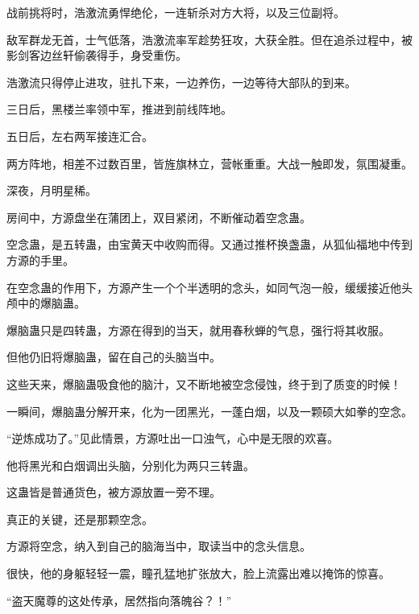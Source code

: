 \begin{this_body}
战前挑将时，浩激流勇悍绝伦，一连斩杀对方大将，以及三位副将。

敌军群龙无首，士气低落，浩激流率军趁势狂攻，大获全胜。但在追杀过程中，被影剑客边丝轩偷袭得手，身受重伤。

浩激流只得停止进攻，驻扎下来，一边养伤，一边等待大部队的到来。

三日后，黑楼兰率领中军，推进到前线阵地。

五日后，左右两军接连汇合。

两方阵地，相差不过数百里，皆旌旗林立，营帐重重。大战一触即发，氛围凝重。

深夜，月明星稀。

房间中，方源盘坐在蒲团上，双目紧闭，不断催动着空念蛊。

空念蛊，是五转蛊，由宝黄天中收购而得。又通过推杯换盏蛊，从狐仙福地中传到方源的手里。

在空念蛊的作用下，方源产生一个个半透明的念头，如同气泡一般，缓缓接近他头颅中的爆脑蛊。

爆脑蛊只是四转蛊，方源在得到的当天，就用春秋蝉的气息，强行将其收服。

但他仍旧将爆脑蛊，留在自己的头脑当中。

这些天来，爆脑蛊吸食他的脑汁，又不断地被空念侵蚀，终于到了质变的时候！

一瞬间，爆脑蛊分解开来，化为一团黑光，一蓬白烟，以及一颗硕大如拳的空念。

“逆炼成功了。”见此情景，方源吐出一口浊气，心中是无限的欢喜。

他将黑光和白烟调出头脑，分别化为两只三转蛊。

这蛊皆是普通货色，被方源放置一旁不理。

真正的关键，还是那颗空念。

方源将空念，纳入到自己的脑海当中，取读当中的念头信息。

很快，他的身躯轻轻一震，瞳孔猛地扩张放大，脸上流露出难以掩饰的惊喜。

“盗天魔尊的这处传承，居然指向落魄谷？！”

\end{this_body}

